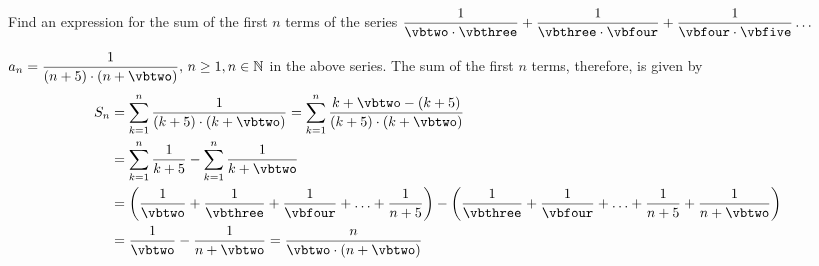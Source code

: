 


\ADD{}\vbtwo
\ADD{}\vbthree
\ADD{}\vbfour
\ADD{}\vbfive

\question[3] Find an expression for the sum of the first $n$ terms of the series 
$\dfrac{1}{\vbtwo\cdot\vbthree} + \dfrac{1}{\vbthree\cdot\vbfour} + \dfrac{1}{\vbfour\cdot\vbfive}\ldots$


\ifprintanswers
\fi 

\begin{solution}[\halfpage]
	 $a_n = \dfrac{1}{(n+\vbone)\cdot(n+\vbtwo)},\, n \geq 1, n\in\mathbb{N}$ in the above series. 
	 The sum of the first $n$ terms, therefore, is given by 
	 \begin{align}
	 	S_n &= \sum_{k=1}^{n}\dfrac{1}{(k+\vbone)\cdot(k+\vbtwo)} =
	 	  \sum_{k=1}^{n}\dfrac{k+\vbtwo - (k+\vbone)}{(k+\vbone)\cdot(k+\vbtwo)} \\
	 	&= \sum_{k=1}^{n}\dfrac{1}{k+\vbone} - \sum_{k=1}^{n}\dfrac{1}{k+\vbtwo} \\
	 	&= \left( \frac{1}{\vbtwo} + \frac{1}{\vbthree} + \frac{1}{\vbfour} + \ldots + \frac{1}{n+\vbone}\right) - 
	 	\left( \frac{1}{\vbthree} + \frac{1}{\vbfour} + \ldots + \frac{1}{n+\vbone} + \frac{1}{n+\vbtwo}\right) \\
	 	&= \dfrac{1}{\vbtwo} - \dfrac{1}{n+\vbtwo} = \dfrac{n}{\vbtwo\cdot(n+\vbtwo)}
	 \end{align}
\end{solution}
